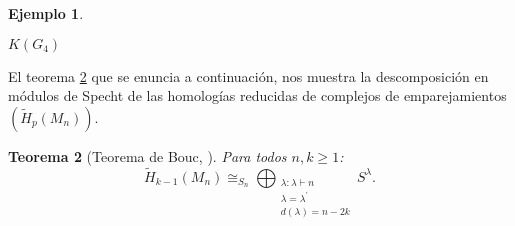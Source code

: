\documentclass[12pt]{book}
\newtheorem{theorem}{Teorema}[section]
\theoremstyle{definition}
\newtheorem{example}[theorem]{Ejemplo}
\newcounter{in}
\newcounter{ini}
\begin{document}
\begin{example}
\begin{center}
\begin{minipage}{0.38\linewidth}

    $K(G_{4})$
  \end{minipage}
\end{center}
\end{example}
El teorema \ref{bouc} que se enuncia a continuación, nos muestra la descomposición en módulos de
Specht de las homologías reducidas de complejos de emparejamientos $(\widetilde H_{p}(M_{n}))$. 

\begin{theorem}[Teorema de Bouc, \cite{MR756517}]
Para todos $n,k\geq1$:
\begin{equation*}
  \widetilde H_{k-1}(M_{n})\cong_{S_{n}}\bigoplus_{\substack{\lambda:\lambda\vdash n\\
      \lambda=\lambda^{'}\\d(\lambda)=n-2k}} S^{\lambda}.
\end{equation*}
\label{bouc}
\end{theorem}
\end{document}
